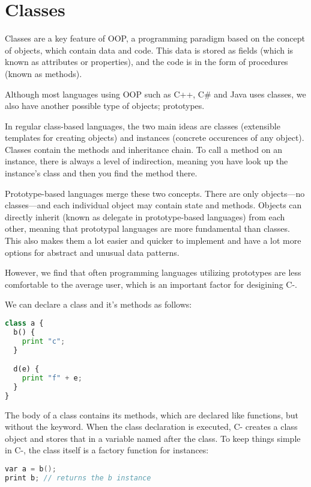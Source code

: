 \section{Classes}

Classes are a key feature of \ac{OOP}, a programming paradigm based on the concept of objects, which contain data and code. This data is stored as fields (which is known as attributes or properties), and the code is in the form of procedures (known as methods). 

Although most languages using \ac{OOP} such as C++, C\# and Java uses classes, we also have another possible type of objects; prototypes.

In regular class-based languages, the two main ideas are classes (extensible templates for creating objects) and instances (concrete occurences of any object). Classes contain the methods and inheritance chain. To call a method on an instance, there is always a level of indirection, meaning you have look up the instance’s class and then you find the method there.

Prototype-based languages merge these two concepts. There are only objects—no classes—and each individual object may contain state and methods. Objects can directly inherit (known as delegate in prototype-based languages) from each other, meaning that prototypal languages are more fundamental than classes. This also makes them a lot easier and quicker to implement and have a lot more options for abstract and unusual data patterns. 

However, we find that often programming languages utilizing prototypes are less comfortable to the average user, which is an important factor for desigining C-.

We can declare a class and it's methods as follows:

\begin{lstlisting}[language=python]
class a {
  b() {
    print "c";
  }

  d(e) {
    print "f" + e;
  }
}
\end{lstlisting}

The body of a class contains its methods, which are declared like functions, but without the keyword. When the class declaration is executed, C- creates a class object and stores that in a variable named after the class. To keep things simple in C-, the class itself is a factory function for instances: 

\begin{lstlisting}[language=C++]
var a = b();
print b; // returns the b instance
\end{lstlisting}

